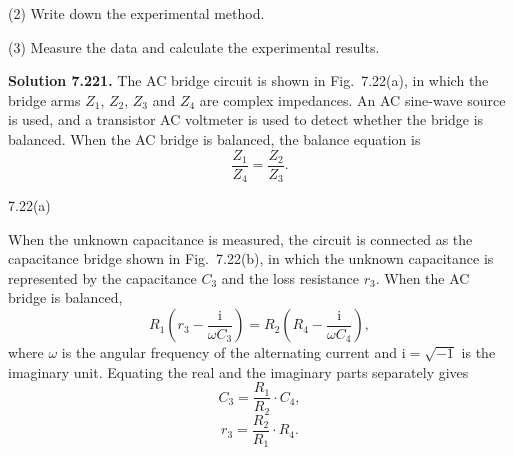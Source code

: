 (2) Write down the experimental method.

(3) Measure the data and calculate the experimental results.

\textbf{Solution 7.22}\quad \textbf{1.} The AC bridge circuit is shown in Fig.~7.22(a), in which the bridge arms $Z_1$, $Z_2$, $Z_3$ and $Z_4$ are complex impedances. An AC sine-wave source is used, and a transistor AC voltmeter is used to detect whether the bridge is balanced. When the AC bridge is balanced, the balance equation is
\begin{equation}
\frac{Z_1}{Z_4}=\frac{Z_2}{Z_3}. \tag{1}
\end{equation}

\begin{figbox}{7.22(a)}
\end{figbox}

When the unknown capacitance is measured, the circuit is connected as the capacitance bridge shown in Fig.~7.22(b), in which the unknown capacitance is represented by the capacitance $C_3$ and the loss resistance $r_3$. When the AC bridge is balanced,
\[
R_1\left(r_3-\frac{\mathrm{i}}{\omega C_3}\right)=R_2\left(R_4-\frac{\mathrm{i}}{\omega C_4}\right),
\]
where $\omega$ is the angular frequency of the alternating current and $\mathrm{i}=\sqrt{-1}$ is the imaginary unit. Equating the real and the imaginary parts separately gives
\begin{equation}
C_3=\frac{R_1}{R_2}\cdot C_4, \tag{2}
\end{equation}
\begin{equation}
r_3=\frac{R_2}{R_1}\cdot R_4. \tag{3}
\end{equation}

